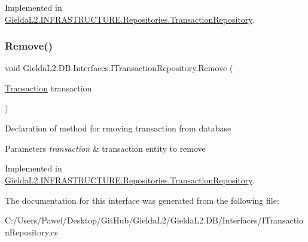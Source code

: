 Implemented in \mbox{\hyperlink{class_gielda_l2_1_1_i_n_f_r_a_s_t_r_u_c_t_u_r_e_1_1_repositories_1_1_transaction_repository_a97d31c2f5374525c76dc08d1ebaa8f52}{Gielda\+L2.\+I\+N\+F\+R\+A\+S\+T\+R\+U\+C\+T\+U\+R\+E.\+Repositories.\+Transaction\+Repository}}.

\mbox{\label{interface_gielda_l2_1_1_d_b_1_1_interfaces_1_1_i_transaction_repository_a6bd6442beda16c8af22a14457f1c6cc5}} 
\subsubsection{\texorpdfstring{Remove()}{Remove()}}
{\footnotesize\ttfamily void Gielda\+L2.\+D\+B.\+Interfaces.\+I\+Transaction\+Repository.\+Remove (\begin{DoxyParamCaption}\item[{\mbox{\hyperlink{class_gielda_l2_1_1_d_b_1_1_entities_1_1_transaction}{Transaction}}}]{transaction }\end{DoxyParamCaption})}



Declaration of method for rmoving transaction from database 


\begin{DoxyParams}{Parameters}
{\em transaction} & transaction entity to remove\\
\hline
\end{DoxyParams}


Implemented in \mbox{\hyperlink{class_gielda_l2_1_1_i_n_f_r_a_s_t_r_u_c_t_u_r_e_1_1_repositories_1_1_transaction_repository_aff0c2a4944edbe498dd4e2ccbc867679}{Gielda\+L2.\+I\+N\+F\+R\+A\+S\+T\+R\+U\+C\+T\+U\+R\+E.\+Repositories.\+Transaction\+Repository}}.



The documentation for this interface was generated from the following file\+:\begin{DoxyCompactItemize}
\item 
C\+:/\+Users/\+Pawel/\+Desktop/\+Git\+Hub/\+Gielda\+L2/\+Gielda\+L2.\+D\+B/\+Interfaces/I\+Transaction\+Repository.\+cs\end{DoxyCompactItemize}
